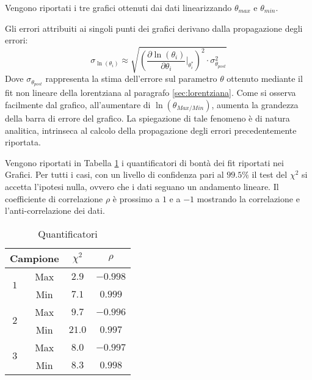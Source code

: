 \documentclass[a4paper,11pt,oneside]{article}
\begin{document}
\begin{figure}[h!]
    \centering
    \newline
    \caption*{}
\end{figure}
Vengono riportati i tre grafici ottenuti dai dati linearizzando $\theta_{max}$ e $\theta_{min}$.

Gli errori attribuiti ai singoli punti dei grafici derivano dalla propagazione degli errori:
\begin{equation*}
 \sigma_{\ln (\theta_i)}\approx \sqrt{\left (\frac{\partial \ln (\theta_i)}{\partial \theta_i} \Big|_{\theta_i^{\ast}} \right )^{2} \cdot \sigma_{\theta_{post}}^2}
\end{equation*}
Dove $\sigma_{\theta_{post}}$ rappresenta la stima dell'errore sul parametro $\theta$ ottenuto mediante il fit non lineare della lorentziana al paragrafo \ref{sec:lorentziana}.
Come si osserva facilmente dal grafico, all'aumentare di $\ln({\theta_{Max/Min}})$, aumenta la grandezza della barra di errore del grafico. La spiegazione di tale fenomeno è di natura analitica, intrinseca al calcolo della propagazione degli errori precedentemente riportata.

Vengono riportati in Tabella \ref{tab:quantificatori} i quantificatori di bontà dei fit riportati nei Grafici. Per tutti i casi, con un livello di confidenza pari al $99.5\%$ il test del $\chi^{2}$  si accetta l'ipotesi nulla, ovvero che i dati seguano un andamento lineare. Il coefficiente di correlazione $\rho$ è prossimo a $1$ e a $-1$ mostrando la correlazione e l'anti-correlazione dei dati.


\begin{table}[h!]
    \centering
    \begin{tabular}{|c|c|c|c|}
        \hline
        \multicolumn{2}{|c|}{Campione} & $\chi^2$ & $\rho$ \\ \hline
        \multirow{2}{*}{$1$} & \cellcolor[rgb]{0.85,0.85,0.85}Max & \cellcolor[rgb]{0.85,0.85,0.85}$2.9$ & \cellcolor[rgb]{0.85,0.85,0.85}$-0.998$ \\ \cline{2-4}
        & Min & $7.1$ & $0.999$\\ \hline
        \multirow{2}{*}{$2$} & \cellcolor[rgb]{0.85,0.85,0.85}Max & \cellcolor[rgb]{0.85,0.85,0.85}$9.7$ & \cellcolor[rgb]{0.85,0.85,0.85}$-0.996$ \\ \cline{2-4}
        & Min & $21.0$ & $0.997$\\ \hline
        \multirow{2}{*}{$3$} & \cellcolor[rgb]{0.85,0.85,0.85}Max & \cellcolor[rgb]{0.85,0.85,0.85}$8.0$ & \cellcolor[rgb]{0.85,0.85,0.85}$-0.997$ \\ \cline{2-4}
        & Min & $8.3$ & $0.998$\\ \hline
    \end{tabular}
    \caption{Quantificatori}
    \label{tab:quantificatori}
\end{table}
\end{document}
